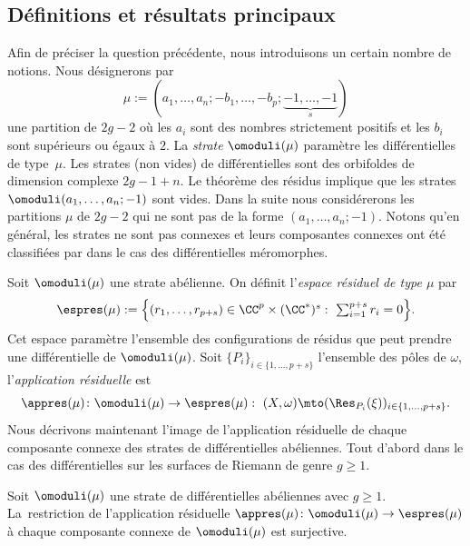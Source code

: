 \subsection{Définitions et résultats principaux}
Afin de préciser la question précédente, nous introduisons un certain nombre de notions. Nous désignerons par
\[
\mu:=(a_{1},\dots,a_{n};-b_{1},\dots,-b_{p};\underbrace{-1,\dots,-1}_{s})\] une partition de $2g-2$ où les $a_{i}$ sont des nombres strictement positifs et les $b_{i}$ sont supérieurs ou égaux à $2$.
La \emph{strate} $\omoduli(\mu)$ paramètre les différentielles de type~$\mu$. Les strates (non vides) de différentielles sont des orbifoldes de dimension complexe $2g-1+n$.
Le théorème des résidus implique que les strates $\omoduli(a_{1},\dots,a_{n};-1)$ sont vides. Dans la suite nous considérerons les partitions $\mu$ de $2g-2$ qui ne sont pas de la forme $(a_{1},\dots,a_{n};-1)$. Notons qu'en général, les strates ne sont pas connexes et leurs composantes connexes ont été classifiées par \cite{Bo} dans le cas des différentielles méromorphes.

Soit $\omoduli(\mu)$ une strate abélienne. On définit l'\emph{espace résiduel de type $\mu$} par
\begin{equation}\textstyle
\espres(\mu) := \Bigl\{ (r_{1},\dots,r_{p+s})\in \CC^{p}\times(\CC^{\ast})^{s}:\ \sum_{i=1}^{p+s} r_{i}=0 \Bigr\}.
\end{equation}
Cet espace paramètre l'ensemble des configurations de résidus que peut prendre une différentielle de $\omoduli(\mu)$.
Soit $\{P_{i}\}_{i\in\{1,\dots,p+s \}}$ l'ensemble des pôles de $\omega$, l'\emph{application résiduelle} est
\begin{equation}
\appres(\mu) \colon \omoduli(\mu) \to \espres(\mu):\ (X,\omega) \mto (\Res_{P_{i}}(\xi))_{i \in \{1,\dots,p+s\} }.
\end{equation}
Nous décrivons maintenant l'image de l'application résiduelle de chaque composante connexe des strates de différentielles abéliennes. Tout d'abord dans le cas des différentielles sur les surfaces de Riemann de genre $g\geq1$.
\begin{thm}\label{thm:ggeq1abel}
Soit $\omoduli(\mu)$ une strate de différentielles abéliennes avec $g\geq1$. La~restriction de l'application résiduelle $\appres(\mu)\colon\omoduli(\mu) \to \espres(\mu)$ à chaque composante connexe de $\omoduli(\mu)$ est surjective.
\end{thm}

